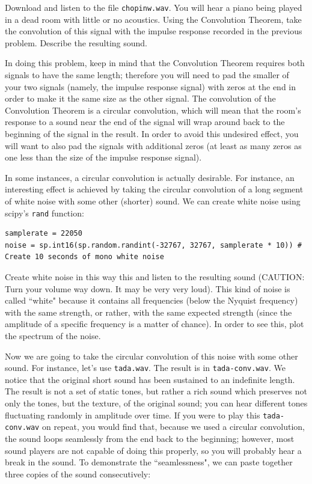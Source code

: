 \begin{problem}\label{convolution_problem}
Download and listen to the file \texttt{chopinw.wav}.
You will hear a piano being played in a dead room with little or no acoustics.
Using the Convolution Theorem, take the convolution of this signal with the impulse response recorded in the previous problem.
Describe the resulting sound.

In doing this problem, keep in mind that the Convolution Theorem requires both signals to have the same length; therefore you will need to pad the smaller of your two signals (namely, the impulse response signal) with zeros at the end in order to make it the same size as the other signal.
The convolution of the Convolution Theorem is a circular convolution, which will mean that the room's response to a sound near the end of the signal will wrap around back to the beginning of the signal in the result.
In order to avoid this undesired effect, you will want to also pad the signals with additional zeros (at least as many zeros as one less than the size of the impulse response signal).
\end{problem}

In some instances, a circular convolution is actually desirable.
For instance, an interesting effect is achieved by taking the circular convolution of a long segment of white noise with some other (shorter) sound.
We can create white noise using scipy's \texttt{rand} function:
\begin{lstlisting}
samplerate = 22050
noise = sp.int16(sp.random.randint(-32767, 32767, samplerate * 10)) # Create 10 seconds of mono white noise
\end{lstlisting}

\begin{problem}
Create white noise in this way this and listen to the resulting sound (CAUTION: Turn your volume way down.  It may be very very loud). 
This kind of noise is called ``white" because it contains all frequencies (below the Nyquist frequency) with the same strength, or rather, with the same expected strength (since the amplitude of a specific frequency is a matter of chance).
In order to see this, plot the spectrum of the noise.
\end{problem}

Now we are going to take the circular convolution of this noise with some other sound.
For instance, let's use \texttt{tada.wav}.
The result is in \texttt{tada-conv.wav}.
We notice that the original short sound has been sustained to an indefinite length.
The result is not a set of static tones, but rather a rich sound which preserves not only the tones, but the texture, of the original sound; you can hear different tones fluctuating randomly in amplitude over time.
If you were to play this \texttt{tada-conv.wav} on repeat, you would find that, because we used a circular convolution, the sound loops seamlessly from the end back to the beginning; however, most sound players are not capable of doing this properly, so you will probably hear a break in the sound. To demonstrate the ``seamlessness", we can paste together three copies of the sound consecutively:

